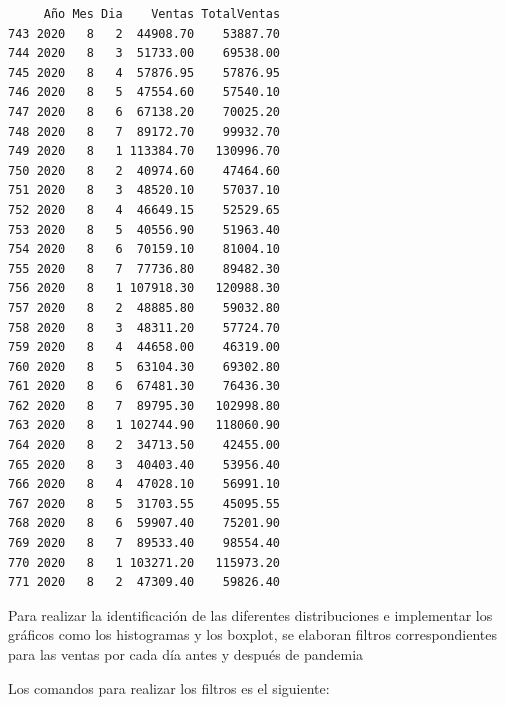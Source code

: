 \documentclass[
  us-letterpaper,
]{scrreprt}
\theoremstyle{definition}
\theoremstyle{plain}
\theoremstyle{plain}
\theoremstyle{remark}
\begin{document}
\begin{verbatim}
     Año Mes Dia    Ventas TotalVentas
743 2020   8   2  44908.70    53887.70
744 2020   8   3  51733.00    69538.00
745 2020   8   4  57876.95    57876.95
746 2020   8   5  47554.60    57540.10
747 2020   8   6  67138.20    70025.20
748 2020   8   7  89172.70    99932.70
749 2020   8   1 113384.70   130996.70
750 2020   8   2  40974.60    47464.60
751 2020   8   3  48520.10    57037.10
752 2020   8   4  46649.15    52529.65
753 2020   8   5  40556.90    51963.40
754 2020   8   6  70159.10    81004.10
755 2020   8   7  77736.80    89482.30
756 2020   8   1 107918.30   120988.30
757 2020   8   2  48885.80    59032.80
758 2020   8   3  48311.20    57724.70
759 2020   8   4  44658.00    46319.00
760 2020   8   5  63104.30    69302.80
761 2020   8   6  67481.30    76436.30
762 2020   8   7  89795.30   102998.80
763 2020   8   1 102744.90   118060.90
764 2020   8   2  34713.50    42455.00
765 2020   8   3  40403.40    53956.40
766 2020   8   4  47028.10    56991.10
767 2020   8   5  31703.55    45095.55
768 2020   8   6  59907.40    75201.90
769 2020   8   7  89533.40    98554.40
770 2020   8   1 103271.20   115973.20
771 2020   8   2  47309.40    59826.40
\end{verbatim}

Para realizar la identificación de las diferentes distribuciones e
implementar los gráficos como los histogramas y los boxplot, se elaboran
filtros correspondientes para las ventas por cada día antes y después de
pandemia

Los comandos para realizar los filtros es el siguiente:
\end{document}

